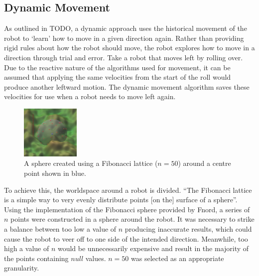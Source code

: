 \documentclass{article}
\begin{document}
\subsection{Dynamic Movement}
As outlined in TODO, a dynamic approach uses the historical movement of the robot to ‘learn’ how to move in a given direction again. Rather than providing rigid rules about how the robot should move, the robot explores how to move in a direction through trial and error. 
Take a robot that moves left by rolling over. Due to the reactive nature of the algorithms used for movement, it can be assumed that applying the same velocities from the start of the roll would produce another leftward motion. The dynamic movement algorithm saves these velocities for use when a robot needs to move left again. \\
\begin{figure}
    \centering
    \vspace*{-5mm}
    \includegraphics[width=0.25\textwidth]{spherePoints}
    \vspace*{-7mm}
    \caption{A sphere created using a Fibonacci lattice ($n=50$) around a centre point shown in blue.}
\end{figure}
To achieve this, the worldspace around a robot is divided. “The Fibonacci lattice is a simple way to very evenly distribute points [on the] surface of a sphere”.  Using the implementation of the Fibonacci sphere provided by Fnord,  a series of $n$ points were constructed in a sphere around the robot. It was necessary to strike a balance between too low a value of $n$ producing inaccurate results, which could cause the robot to veer off to one side of the intended direction. Meanwhile, too high a value of $n$ would be unnecessarily expensive and result in the majority of the points containing $null$ values. $n=50$ was selected as an appropriate granularity.\\
\end{document}
